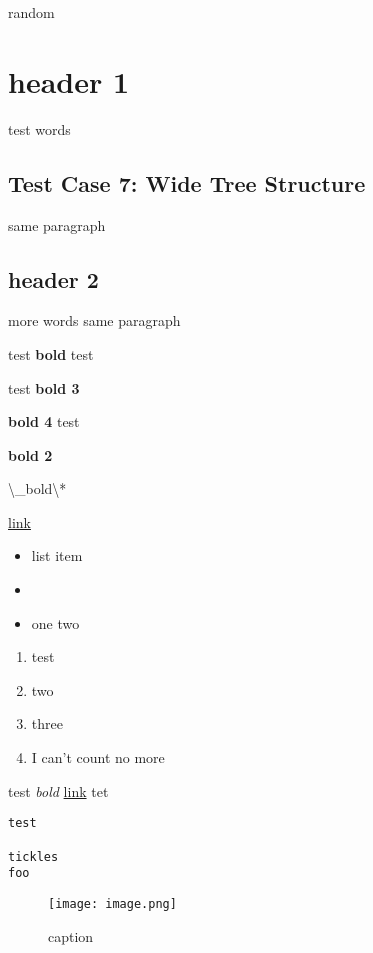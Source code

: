 \documentclass{article}
\begin{document}
random

\section{header 1}
test words

\subsection{Test Case 7: Wide Tree Structure}
same paragraph
\subsection{header 2}
more words same paragraph

test \textbf{bold} test

test \textbf{bold 3}

\textbf{bold 4} test

\textbf{bold 2}

\textbackslash{}_bold\textbackslash{}*

\href{www.test.com}{link}

\begin{itemize}
\item list item
\item 
\item one two
\end{itemize}
\begin{enumerate}
\item test
\item two
\item three
\item I can't count no more
\end{enumerate}
test \emph{bold} \href{e.com}{link} tet


\begin{verbatim}
test

tickles
foo
\end{verbatim}
\begin{figure}[h]\centering\texttt{[image: image.png]}\caption{caption}\end{figure}
\end{document}
